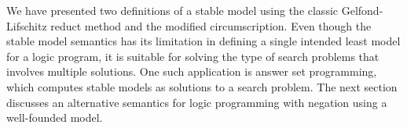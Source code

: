 We have presented two definitions of a stable model using the classic 
Gelfond-\\Lifschitz reduct method 
and the modified circumscription. Even though the stable model semantics has its limitation in 
defining a single intended least model for a logic program, it is suitable for solving 
the type of search problems that involves multiple solutions. One such application is answer 
set programming, which computes stable models as solutions to a search problem. The next 
section discusses an alternative semantics for logic programming with negation using 
a well-founded model.